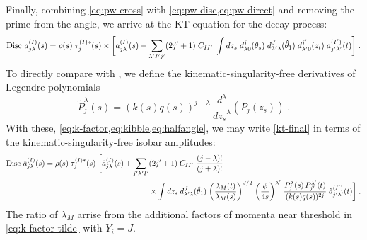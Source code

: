 Finally, combining \cref{eq:pw-cross} with \cref{eq:pw-disc,eq:pw-direct} and removing the prime from the angle, we arrive at the KT equation for the decay process:
  \begin{align}
    \label{kt-final}
    \text{Disc } a_{j\lambda}^{(I)}(s) = \rho(s) \; \tau^{(I)*}_j(s) \times
    \bigg[
    a_{j\lambda}^{(I)}(s) +
    \sum_{{\lambda^\prime} {I^\prime} {j^\prime}}  (2{j^\prime}+1) \; C_{I{I^\prime}} \;
    \int d z_s \;  d_{\lambda0}^j(\theta_s) \; d_{{\lambda^\prime} \lambda}^J(\hat{\theta}_1) \;
       d_{{\lambda^\prime} 0}^{j^\prime}(z_t) \; a^{({I^\prime})}_{{j^\prime} {\lambda^\prime}}(t)
    \bigg] \; .
  \end{align}
To directly compare with \cite{Danilkin:2014cra,Niecknig:2012sj}, we define the kinematic-singularity-free derivatives of Legendre polynomials
    \begin{equation}
    \tilde{P}_{j}^\lambda(s) = (k(s)q(s))^{j-\lambda} \, \frac{d^\lambda}{{dz_s}^\lambda} (P_j(z_s)) \; .
  \end{equation}
With these, \cref{eq:k-factor,eq:kibble,eq:halfangle}, we may write \cref{kt-final} in terms of the kinematic-singularity-free isobar amplitudes:
  \begin{align}
    \text{Disc } \hat{a}_{j\lambda}^{(I)}(s) = \rho(s) \; \tau^{(I)*}_j(s) \;
    \bigg[
    \hat{a}_{j\lambda}^{(I)}(s) + \sum_{{j^\prime} {\lambda^\prime} {I^\prime}}  &(2{j^\prime}+1) \; C_{I{I^\prime}} \;
    \frac{(j-\lambda)!}{(j+\lambda)!} \nonumber \\
    &\times \int d z_s \; d_{{\lambda^\prime} \lambda}^J(\hat{\theta}_1) \;
    \bigg(\frac{\lambda_M(t)}{\lambda_M(s)}\bigg)^{J/2} \;
    \bigg(\frac{\phi}{4s}\bigg)^{\lambda^\prime} \;
    \frac{
    \tilde{P}_{j}^\lambda(s) \, \tilde{P}_{{j^\prime}}^{\lambda^\prime}(t)
    }{
    (k(s)q(s))^{2j}
    } \;
    \hat{a}_{{j^\prime} {\lambda^\prime}}^{({I^\prime})}(t)
    \bigg] \; .
  \end{align}
The ratio of \(\lambda_M\) arrise from the additional factors of momenta near threshold in \cref{eq:k-factor-tilde} with \(Y_i = J\). 

